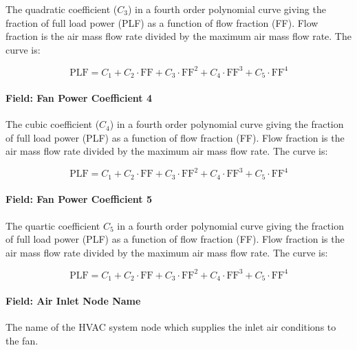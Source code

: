 The quadratic coefficient (\(C_3\)) in a fourth order polynomial curve giving the fraction of full load power (PLF) as a function of flow fraction (FF). Flow fraction is the air mass flow rate divided by the maximum air mass flow rate. The curve is:

\begin{equation}
\mathrm{PLF} = C_1 + C_2 \cdot \mathrm{FF} + C_3 \cdot \mathrm{FF}^2 + C_4 \cdot \mathrm{FF}^3 + C_5 \cdot \mathrm{FF}^4
\end{equation}

\paragraph{Field: Fan Power Coefficient 4}\label{field-fan-power-coefficient-4}

The cubic coefficient (\(C_4\)) in a fourth order polynomial curve giving the fraction of full load power (PLF) as a function of flow fraction (FF). Flow fraction is the air mass flow rate divided by the maximum air mass flow rate. The curve is:

\begin{equation}
\mathrm{PLF} = C_1 + C_2 \cdot \mathrm{FF} + C_3 \cdot \mathrm{FF}^2 + C_4 \cdot \mathrm{FF}^3 + C_5 \cdot \mathrm{FF}^4
\end{equation}

\paragraph{Field: Fan Power Coefficient 5}\label{field-fan-power-coefficient-5}

The quartic coefficient \(C_5\) in a fourth order polynomial curve giving the fraction of full load power (PLF) as a function of flow fraction (FF). Flow fraction is the air mass flow rate divided by the maximum air mass flow rate. The curve is:

\begin{equation}
\mathrm{PLF} = C_1 + C_2 \cdot \mathrm{FF} + C_3 \cdot \mathrm{FF}^2 + C_4 \cdot \mathrm{FF}^3 + C_5 \cdot \mathrm{FF}^4
\end{equation}

\paragraph{Field: Air Inlet Node Name}\label{field-air-inlet-node-name-2-000}

The name of the HVAC system node which supplies the inlet air conditions to the fan.

